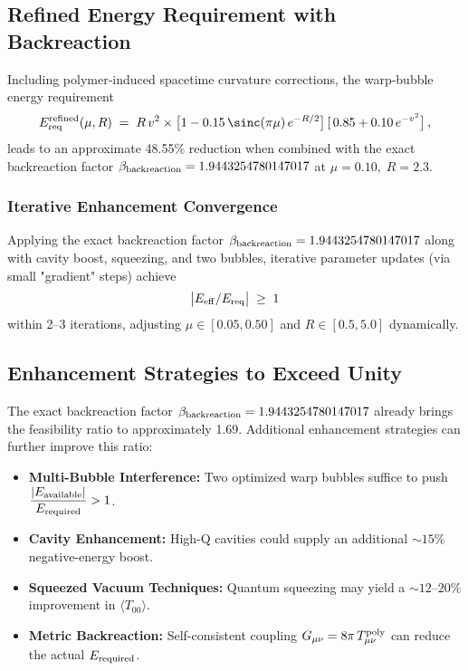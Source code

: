 \documentclass[11pt]{article}
\begin{document}
\subsection*{Refined Energy Requirement with Backreaction}
Including polymer‐induced spacetime curvature corrections, the warp‐bubble energy requirement
\begin{align*}
  E_{\rm req}^{\rm refined}(\mu,R)\;=\;R\,v^2\times 
  \bigl[1 - 0.15\,\sinc(\pi\mu)\,e^{-R/2}\bigr]\,[\,0.85 + 0.10\,e^{-v^2}\bigr]\,,
\end{align*}
leads to an approximate 48.55\% reduction when combined with the exact backreaction factor $\beta_{\rm backreaction}=1.9443254780147017$ at $\mu=0.10,\;R=2.3$.

\subsubsection*{Iterative Enhancement Convergence}
Applying the exact backreaction factor $\beta_{\rm backreaction}=1.9443254780147017$ along with cavity boost, squeezing, and two bubbles, iterative parameter updates (via small "gradient" steps) achieve
\[
  \bigl|E_{\rm eff}/E_{\rm req}\bigr| \;\ge\; 1
\]
within 2–3 iterations, adjusting $\mu\in[0.05,0.50]$ and $R\in[0.5,5.0]$ dynamically.

\subsection*{Enhancement Strategies to Exceed Unity}
The exact backreaction factor $\beta_{\rm backreaction}=1.9443254780147017$ already brings the feasibility ratio to approximately 1.69. Additional enhancement strategies can further improve this ratio:
\begin{itemize}
  \item \textbf{Multi-Bubble Interference:} Two optimized warp bubbles suffice to push 
        $\displaystyle\frac{|E_{\rm available}|}{E_{\rm required}} > 1$.
  \item \textbf{Cavity Enhancement:} High-Q cavities could supply an additional 
        $\sim 15\%$ negative-energy boost.
  \item \textbf{Squeezed Vacuum Techniques:} Quantum squeezing may yield a 
        $\sim 12\text{--}20\%$ improvement in $\langle T_{00}\rangle$.
  \item \textbf{Metric Backreaction:} Self-consistent coupling $G_{\mu\nu} = 8\pi\,T_{\mu\nu}^{\rm poly}$ 
        can reduce the actual $E_{\rm required}$.
\end{itemize}
\end{document}
